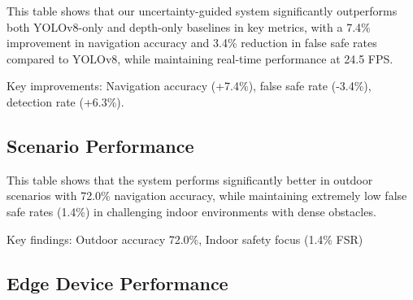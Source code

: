 \documentclass[12pt,oneside]{book}
\begin{document}
This table shows that our uncertainty-guided system significantly outperforms both YOLOv8-only and depth-only baselines in key metrics, with a 7.4\% improvement in navigation accuracy and 3.4\% reduction in false safe rates compared to YOLOv8, while maintaining real-time performance at 24.5 FPS.

Key improvements: Navigation accuracy (+7.4\%), false safe rate (-3.4\%), detection rate (+6.3\%).

\subsection{Scenario Performance}

\begin{table}[ht]
\centering
\caption{Performance Analysis Across Navigation Scenarios}
\label{tab:scenario_performance}
\end{table}

This table shows that the system performs significantly better in outdoor scenarios with 72.0\% navigation accuracy, while maintaining extremely low false safe rates (1.4\%) in challenging indoor environments with dense obstacles.

Key findings: Outdoor accuracy 72.0\%, Indoor safety focus (1.4\% FSR)

\subsection{Edge Device Performance}
\end{document}
